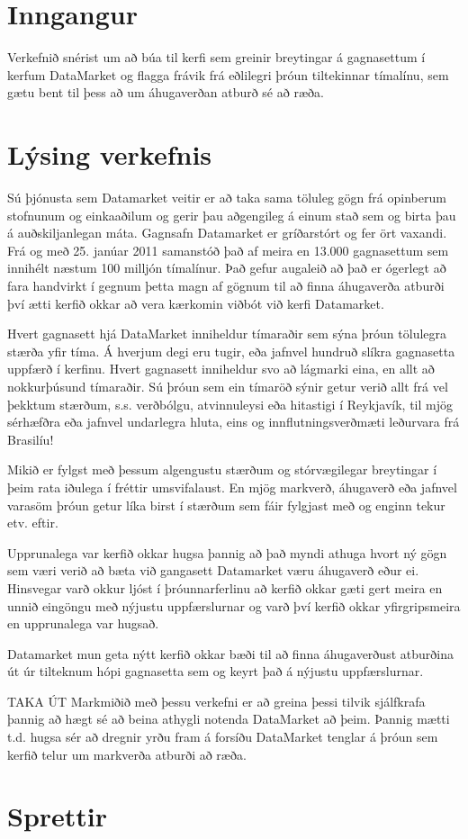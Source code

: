 \documentclass{article}
\begin{document}
\tableofcontents
\newpage

\section{Inngangur}
Verkefnið snérist um að búa til kerfi sem greinir breytingar á gagnasettum í kerfum DataMarket og flagga frávik frá eðlilegri þróun tiltekinnar tímalínu, sem gætu bent til þess að um áhugaverðan atburð sé að ræða.

\section{Lýsing verkefnis}
Sú þjónusta sem Datamarket veitir er að taka sama töluleg gögn frá opinberum stofnunum og einkaaðilum og gerir þau aðgengileg á einum stað sem og birta þau á auðskiljanlegan máta. Gagnsafn Datamarket er gríðarstórt og fer ört vaxandi. Frá og með 25. janúar 2011 samanstóð það af meira en 13.000 gagnasettum sem innihélt næstum 100 milljón tímalínur. Það gefur augaleið að það er ógerlegt að fara handvirkt í gegnum þetta magn af gögnum til að finna áhugaverða atburði því ætti kerfið okkar að vera kærkomin viðbót við kerfi Datamarket.

Hvert gagnasett hjá DataMarket inniheldur tímaraðir sem sýna þróun tölulegra stærða yfir tíma. Á hverjum degi eru tugir, eða jafnvel hundruð slíkra gagnasetta uppfærð í kerfinu. Hvert gagnasett inniheldur svo að lágmarki eina, en allt að nokkurþúsund tímaraðir. Sú þróun sem ein tímaröð sýnir getur verið allt frá vel þekktum stærðum, s.s. verðbólgu, atvinnuleysi eða hitastigi í Reykjavík, til mjög sérhæfðra eða jafnvel undarlegra hluta, eins og innflutningsverðmæti leðurvara frá Brasilíu!

Mikið er fylgst með þessum algengustu stærðum og stórvægilegar breytingar í þeim rata iðulega í fréttir umsvifalaust. En mjög markverð, áhugaverð eða jafnvel varasöm þróun getur líka birst í stærðum sem fáir fylgjast með og enginn tekur etv. eftir.

Upprunalega var kerfið okkar hugsa þannig að það myndi athuga hvort ný gögn sem væri verið að bæta við gangasett Datamarket væru áhugaverð eður ei. Hinsvegar varð okkur ljóst í þróunnarferlinu að kerfið okkar gæti gert meira en unnið eingöngu með nýjustu uppfærslurnar og varð því kerfið okkar yfirgripsmeira en upprunalega var hugsað.

Datamarket mun geta nýtt kerfið okkar bæði til að finna áhugaverðust atburðina út úr tilteknum hópi gagnasetta sem og keyrt það á nýjustu uppfærslurnar.

TAKA ÚT Markmiðið með þessu verkefni er að greina þessi tilvik sjálfkrafa þannig að hægt sé að beina athygli notenda DataMarket að þeim. Þannig mætti t.d. hugsa sér að dregnir yrðu fram á forsíðu DataMarket tenglar á þróun sem kerfið telur um markverða atburði að ræða.

\newpage

\section{Sprettir}
\end{document}
